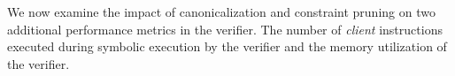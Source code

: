 %
%
%

We now examine the impact of canonicalization and constraint
pruning on two additional performance metrics in the verifier. The
number of \emph{client} instructions executed during symbolic
execution by the verifier and the memory utilization of the verifier.

